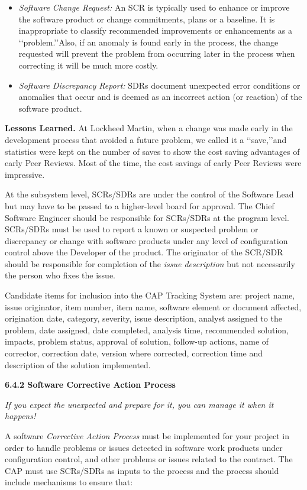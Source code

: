 \documentclass[8pt,twocolumn]{amsart}
\theoremstyle{plain}
\begin{document}
\begin{itemize}
\item {\em Software Change Request:} An SCR is typically used to enhance or improve the software product or change commitments, plans or a baseline. It is inappropriate to classify recommended improvements or enhancements as a \lq\lq problem.\rq\rq Also, if an anomaly is found early in the process, the change requested will prevent the problem from occurring later in the process when correcting it will be much more costly.
\item {\em Software Discrepancy Report:} SDRs document unexpected error conditions or anomalies that occur and is deemed as an incorrect action (or reaction) of the software product.
\end{itemize}

{\bf Lessons Learned.} At Lockheed Martin, when a change was made early in the development process that avoided a future problem, we called it a \lq\lq save,\rq\rq and statistics were kept on the number of saves to show the cost saving advantages of early Peer Reviews. Most of the time, the cost savings of early Peer Reviews were impressive.

At the subsystem level, SCRs/SDRs are under the control of the Software Lead but may have to be passed to a higher-level board for approval. The Chief Software Engineer should be responsible for SCRs/SDRs at the program level. SCRs/SDRs must be used to report a known or suspected problem or discrepancy or change with software products under any level of configuration control above the Developer of the product. The originator of the SCR/SDR should be responsible for completion of the {\em issue description} but not necessarily the person who fixes the issue.

Candidate items for inclusion into the CAP Tracking System are: project name, issue originator, item number, item name, software element or document affected, origination date, category, severity, issue description, analyst assigned to the problem, date assigned, date completed, analysis time, recommended solution, impacts, problem status, approval of solution, follow-up actions, name of corrector, correction date, version where corrected, correction time and description of the solution implemented.

{\bf 6.4.2 Software Corrective Action Process}

{\em If you expect the unexpected and prepare for it, you can manage it when it happens!}

A software {\em Corrective Action Process} must be implemented for your project in order to handle problems or issues detected in software work products under configuration control, and other problems or issues related to the contract. The CAP must use SCRs/SDRs as inputs to the process and the process should include mechanisms to ensure that:
\end{document}
